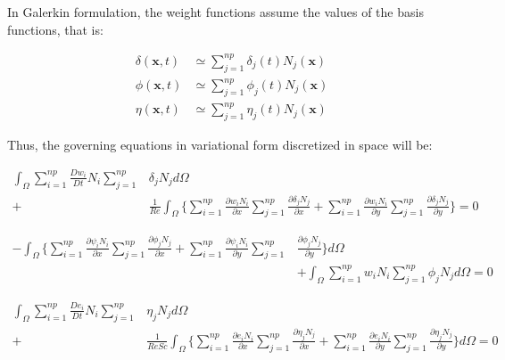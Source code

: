\medskip
In Galerkin formulation, the weight functions assume 
the values of the basis functions, that is:

\begin{align}
 \delta(\textbf{x},t) & \simeq \sum\limits_{j=1}^{np} \delta_j(t) N_j(\textbf{x}) \\
 \phi(\textbf{x},t) & \simeq \sum\limits_{j=1}^{np} \phi_j(t) N_j(\textbf{x}) \\
 \eta(\textbf{x},t) & \simeq \sum\limits_{j=1}^{np} \eta_j(t) N_j(\textbf{x})
\end{align}

\noindent
Thus, the governing equations in variational form 
discretized in space will be:

\begin{equation} \label{convection vorticity}
 \begin{aligned} 
  \int_{\Omega} \sum\limits_{i=1}^{np} \frac{D w_i}{Dt} N_i 
                \sum\limits_{j=1}^{np} & \delta_j N_j d\Omega 
  \\[5pt]
  + & \frac{1}{\textit{Re}} \int_{\Omega} \Bigg\{ 
                    \sum\limits_{i=1}^{np} \frac{\partial w_i N_i}{\partial x} 
                    \sum\limits_{j=1}^{np} \frac{\partial \delta_j N_j}{\partial x} 
  +                 \sum\limits_{i=1}^{np} \frac{\partial w_i N_i}{\partial y} 
                    \sum\limits_{j=1}^{np} \frac{\partial \delta_j N_j}{\partial y} \Bigg\}
 = 0
 \end{aligned}
\end{equation}

\begin{equation}
 \begin{aligned}
  - \int_{\Omega} \Bigg\{ 
                  \sum\limits_{i=1}^{np} \frac{\partial \psi_i N_i}{\partial x} 
                  \sum\limits_{j=1}^{np} \frac{\partial \phi_j N_j}{\partial x} 
  +               \sum\limits_{i=1}^{np} \frac{\partial \psi_i N_i}{\partial y} 
                  \sum\limits_{j=1}^{np} & \frac{\partial \phi_j N_j}{\partial y} 
  \Bigg\} d\Omega 
  \\[5pt]
  & + \int_{\Omega} \sum\limits_{i=1}^{np} w_i N_i 
                  \sum\limits_{j=1}^{np} \phi_j N_j d\Omega = 0
 \end{aligned}
\end{equation}

\medskip
\begin{equation} \label{convection concentration}
 \begin{aligned} 
  \int_{\Omega} \sum\limits_{i=1}^{np} \frac{D e_i}{Dt} N_i 
                \sum\limits_{j=1}^{np} & \eta_j N_j d\Omega 
  \\[5pt]
  + & \frac{1}{\textit{ReSc}} \int_{\Omega} \Bigg\{ 
                    \sum\limits_{i=1}^{np} \frac{\partial e_i N_i}{\partial x} 
                    \sum\limits_{j=1}^{np} \frac{\partial \eta_j N_j}{\partial x} 
  +                 \sum\limits_{i=1}^{np} \frac{\partial e_i N_i}{\partial y} 
                    \sum\limits_{j=1}^{np} \frac{\partial \eta_j N_j}{\partial y} \Bigg\} d\Omega
 = 0
 \end{aligned}
\end{equation}

